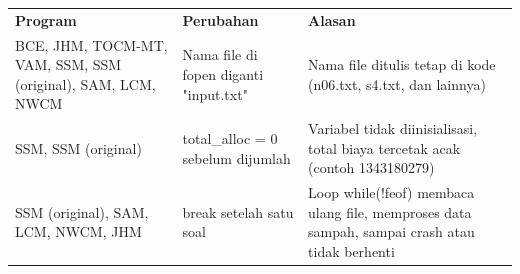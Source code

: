 \documentclass[10pt,a4paper]{article}
\newcounter{none}
\begin{document}
{\def\LTcaptype{none} %
\begin{longtable}[]{@{}
  >{\raggedright\arraybackslash}p{}
  >{\raggedright\arraybackslash}p{}
  >{\raggedright\arraybackslash}p{}@{}}
\toprule\noalign{}
\begin{minipage}[b]{\linewidth}\raggedright
\textbf{Program}
\end{minipage} & \begin{minipage}[b]{\linewidth}\centering
\textbf{Perubahan}
\end{minipage} & \begin{minipage}[b]{\linewidth}\centering
\textbf{Alasan}
\end{minipage} \\
\begin{minipage}[b]{\linewidth}\raggedright
BCE, JHM, TOCM-MT, VAM, SSM, SSM (original), SAM, LCM, NWCM
\end{minipage} & \begin{minipage}[b]{\linewidth}\centering
Nama file di fopen diganti "input.txt"
\end{minipage} & \begin{minipage}[b]{\linewidth}\centering
Nama file ditulis tetap di kode (n06.txt, s4.txt, dan lainnya)
\end{minipage} \\
\begin{minipage}[b]{\linewidth}\raggedright
SSM, SSM (original)
\end{minipage} & \begin{minipage}[b]{\linewidth}\centering
total\_alloc = 0 sebelum dijumlah
\end{minipage} & \begin{minipage}[b]{\linewidth}\centering
Variabel tidak diinisialisasi, total biaya tercetak acak (contoh
1343180279)
\end{minipage} \\
\begin{minipage}[b]{\linewidth}\raggedright
SSM (original), SAM, LCM, NWCM, JHM
\end{minipage} & \begin{minipage}[b]{\linewidth}\centering
break setelah satu soal
\end{minipage} & \begin{minipage}[b]{\linewidth}\centering
Loop while(!feof) membaca ulang file, memproses data sampah, sampai
crash atau tidak berhenti

\end{minipage}
\end{longtable}}
\end{document}
